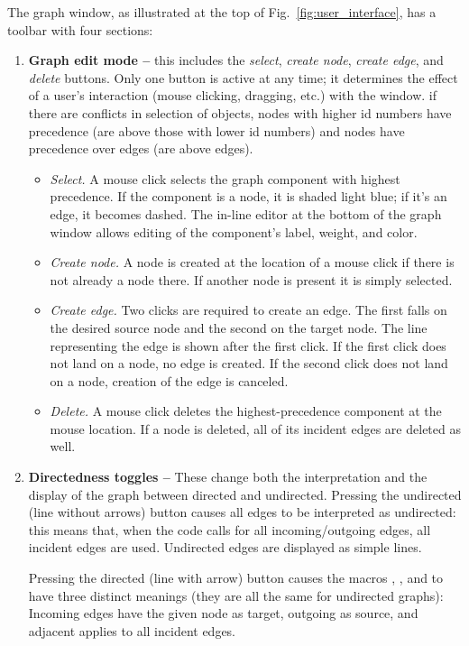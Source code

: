 The graph window, as illustrated at the top of Fig.~\ref{fig:user_interface},
has a toolbar with four sections:
\begin{enumerate}
\item
\textbf{Graph edit mode -- }
this includes the \emph{select}, \emph{create node}, \emph{create edge}, and \emph{delete} buttons.
Only one button is active at any time; it determines the effect
of a user's interaction (mouse clicking, dragging, etc.) with the window.
if there are conflicts in selection of objects, nodes with higher id numbers have precedence (are above those with lower id numbers) and nodes
have precedence over edges (are above edges).
\begin{itemize}
\item \emph{Select.} A mouse click selects the graph component with highest precedence.
If the component is a node, it is shaded light blue; if it's an edge, it
becomes dashed.
The in-line editor at the bottom of the graph window allows editing of the
component's label, weight, and color.
\item \emph{Create node.}
A node is created at the location of a mouse click if there is not already a node there.
If another node is present it is simply selected.
\item \emph{Create edge.}
Two clicks are required to create an edge. The first falls on the desired
source node and the second on the target node.
The line representing the edge is shown after the first click.
If the first click does not land on a node, no edge is created.
If the second click does not land on a node, creation of the edge is canceled.
\item \emph{Delete.}
A mouse click deletes the highest-precedence component at the mouse location.
If a node is deleted, all of its incident edges are deleted as well.
\end{itemize}

\item
\textbf{Directedness toggles --}
These change both the interpretation and the
display of the graph between directed and undirected.
Pressing the undirected (line without arrows) button causes
all edges to be interpreted as undirected: this means that, when the code
calls for all incoming/outgoing edges, all incident edges are used.
Undirected edges are displayed as simple lines.

Pressing the directed (line with arrow) button causes the macros
, , and 
to have three distinct meanings (they are all the same for undirected graphs):
Incoming edges have the given node as target, outgoing as source, and adjacent applies to all incident edges.


\end{enumerate}
